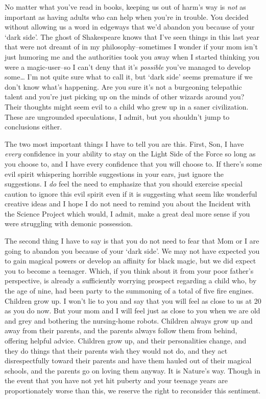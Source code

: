 \begin{writtenNote}

No matter what you've read in books, keeping us out of harm's way is \emph{not} as important as having adults who can help when you're in trouble. You decided without allowing us a word in edgeways that we'd abandon you because of your `dark side'. The ghost of Shakespeare knows that I've seen things in this last year that were not dreamt of in my philosophy\---sometimes I wonder if your mom isn't just humoring me and the authorities took you away when I started thinking you were a magic-user\---so I can't deny that it's \emph{possible} you've managed to develop some{\ldots} I'm not quite sure what to call it, but `dark side' seems premature if we don't know what's happening. Are you sure it's not a burgeoning telepathic talent and you're just picking up on the minds of other wizards around you? Their thoughts might seem evil to a child who grew up in a saner civilization. These are ungrounded speculations, I admit, but you shouldn't jump to conclusions either.

The two most important things I have to tell you are this. First, Son, I have \emph{every} confidence in your ability to stay on the Light Side of the Force so long as you choose to, and I have every confidence that you will choose to. If there's some evil spirit whispering horrible suggestions in your ears, just ignore the suggestions. I \emph{do} feel the need to emphasize that you should exercise special caution to ignore this evil spirit even if it is suggesting what seem like wonderful creative ideas and I hope I do not need to remind you about the Incident with the Science Project which would, I admit, make a great deal more sense if you were struggling with demonic possession.

The second thing I have to say is that you do not need to fear that Mom or I are going to abandon you because of your `dark side'. We may not have expected you to gain magical powers or develop an affinity for black magic, but we did expect you to become a teenager. Which, if you think about it from your poor father's perspective, is already a sufficiently worrying prospect regarding a child who, by the age of nine, had been party to the summoning of a total of five fire engines. Children grow up. I won't lie to you and say that you will feel as close to us at 20 as you do now. But your mom and I will feel just as close to you when we are old and grey and bothering the nursing-home robots. Children always grow up and away from their parents, and the parents always follow them from behind, offering helpful advice. Children grow up, and their personalities change, and they do things that their parents wish they would not do, and they act disrespectfully toward their parents and have them hauled out of their magical schools, and the parents go on loving them anyway. It is Nature's way. Though in the event that you have not yet hit puberty and your teenage years are proportionately worse than this, we reserve the right to reconsider this sentiment.


\end{writtenNote}
